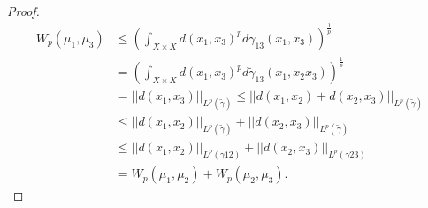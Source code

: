 \begin{proof}
    \begin{align*}
        W_p(\mu_1, \mu_3) &\leq \left(\int_{X \times X} d(x_1, x_3)^p d \bar \gamma_{13}(x_1, x_3)\right)^\frac{1}{p} \\
        &= \left(\int_{X \times X} d(x_1, x_3)^p d \tilde \gamma_{13}(x_1, x_2 x_3)\right)^\frac{1}{p} \\
        &= ||d(x_1, x_3)||_{L^p(\tilde \gamma)} \leq ||d(x_1, x_2) + d(x_2, x_3)||_{L^p(\tilde \gamma)} \\
        &\leq ||d(x_1, x_2)||_{L^p(\tilde \gamma)} + ||d(x_2, x_3)||_{L^p(\tilde \gamma)} \\
        &\leq ||d(x_1, x_2)||_{L^p(\gamma{12})} + ||d(x_2, x_3)||_{L^p(\gamma{23})} \\
        &= W_p(\mu_1, \mu_2) + W_p(\mu_2, \mu_3).
    \end{align*}
\end{proof}